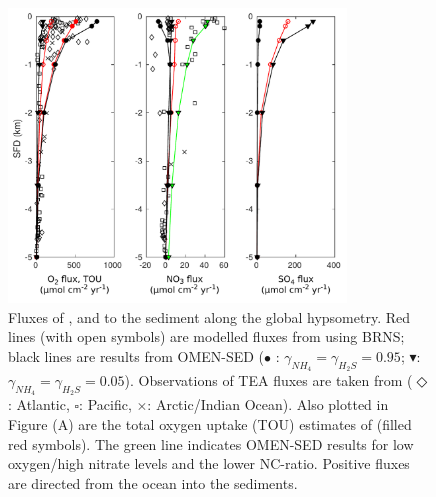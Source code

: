 \documentclass[gmd, manuscript]{copernicus}
\begin{document}
\begin{figure}[tbp]
\begin{center}
	\includegraphics[width=0.8\textwidth]{figures/0_OMEN_Thullner_hypsometry_fluxes_diff_NCratio.pdf}
	\caption{Fluxes of ,  and  to the sediment along the global hypsometry. 
	Red lines (with open symbols) are modelled fluxes from \citet{thullner_global_scale_2009} using BRNS; black lines are results from OMEN-SED ($\bullet$ : $\gamma_{NH_4}=\gamma_{H_2S}=0.95$; 
	$\blacktriangledown$: $\gamma_{NH_4}=\gamma_{H_2S}=0.05$). 
	Observations of TEA fluxes are taken from \citet{middelburg_denitrification_1996} ($\Diamond$: Atlantic, $\square$: Pacific, $\times$: Arctic/Indian Ocean). 
	Also plotted in Figure (A) are the total oxygen uptake (TOU) estimates of \citet{thullner_global_scale_2009} (filled red symbols). The green line indicates OMEN-SED results for low oxygen/high nitrate levels and the lower 
	NC-ratio. Positive fluxes are directed from the ocean into the sediments.
	}\label{fig:hypsometry}
\end{center}
\end{figure}
\end{document}
